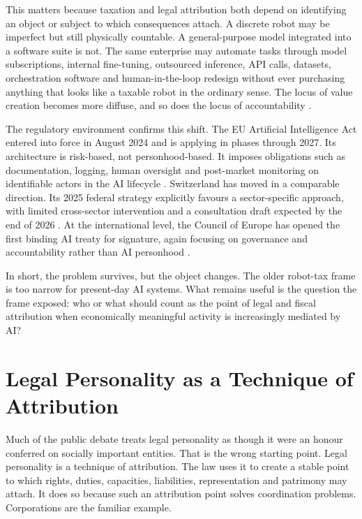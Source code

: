 \documentclass[11pt]{article}
\begin{document}
This matters because taxation and legal attribution both depend on identifying an object or subject to which consequences attach. A discrete robot may be imperfect but still physically countable. A general-purpose model integrated into a software suite is not. The same enterprise may automate tasks through model subscriptions, internal fine-tuning, outsourced inference, API calls, datasets, orchestration software and human-in-the-loop redesign without ever purchasing anything that looks like a taxable robot in the ordinary sense. The locus of value creation becomes more diffuse, and so does the locus of accountability \citep{brollo2024,oecd2025adoption}.

The regulatory environment confirms this shift. The EU Artificial Intelligence Act entered into force in August 2024 and is applying in phases through 2027. Its architecture is risk-based, not personhood-based. It imposes obligations such as documentation, logging, human oversight and post-market monitoring on identifiable actors in the AI lifecycle \citep{eu2024aiact,ec2026aiactfaq}. Switzerland has moved in a comparable direction. Its 2025 federal strategy explicitly favours a sector-specific approach, with limited cross-sector intervention and a consultation draft expected by the end of 2026 \citep{ofcom2025swissai}. At the international level, the Council of Europe has opened the first binding AI treaty for signature, again focusing on governance and accountability rather than AI personhood \citep{coe2024framework}.

In short, the problem survives, but the object changes. The older robot-tax frame is too narrow for present-day AI systems. What remains useful is the question the frame exposed: who or what should count as the point of legal and fiscal attribution when economically meaningful activity is increasingly mediated by AI?

\section{Legal Personality as a Technique of Attribution}
Much of the public debate treats legal personality as though it were an honour conferred on socially important entities. That is the wrong starting point. Legal personality is a technique of attribution. The law uses it to create a stable point to which rights, duties, capacities, liabilities, representation and patrimony may attach. It does so because such an attribution point solves coordination problems. Corporations are the familiar example.
\end{document}

